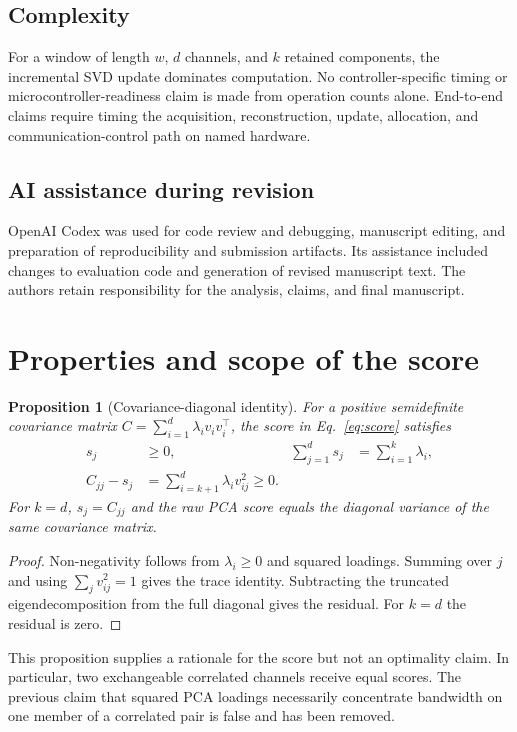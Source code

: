 \documentclass[pdflatex,sn-vancouver-num]{sn-jnl}
\theoremstyle{thmstyleone}
\newtheorem{proposition}{Proposition}
\begin{document}
\subsection{Complexity}

For a window of length $w$, $d$ channels, and $k$ retained components, the
incremental SVD update dominates computation. No controller-specific timing or microcontroller-readiness claim is made
from operation counts alone. End-to-end claims require timing the acquisition, reconstruction,
update, allocation, and communication-control path on named hardware.

\subsection{AI assistance during revision}
OpenAI Codex was used for code review and debugging, manuscript editing,
and preparation of reproducibility and submission artifacts. Its assistance
included changes to evaluation code and generation of revised manuscript text.
The authors retain responsibility for the analysis, claims, and final manuscript.

\section{Properties and scope of the score}

\begin{proposition}[Covariance-diagonal identity]
For a positive semidefinite covariance matrix
$C=\sum_{i=1}^{d}\lambda_i v_iv_i^\top$, the score in
Eq.~\eqref{eq:score} satisfies
\begin{align}
 s_j&\geq0, & \sum_{j=1}^{d}s_j&=\sum_{i=1}^{k}\lambda_i,\\
 C_{jj}-s_j&=\sum_{i=k+1}^{d}\lambda_i v_{ij}^{2}\geq0.
\end{align}
For $k=d$, $s_j=C_{jj}$ and the raw PCA score equals the diagonal variance of the same covariance matrix.
\end{proposition}
\begin{proof}
Non-negativity follows from $\lambda_i\geq0$ and squared loadings. Summing over
$j$ and using $\sum_jv_{ij}^2=1$ gives the trace identity. Subtracting the
truncated eigendecomposition from the full diagonal gives the residual. For
$k=d$ the residual is zero.
\end{proof}

This proposition supplies a rationale for the score but not an optimality
claim. In particular, two exchangeable correlated channels receive equal
scores. The previous claim that squared PCA loadings necessarily concentrate
bandwidth on one member of a correlated pair is false and has been removed.
\end{document}
